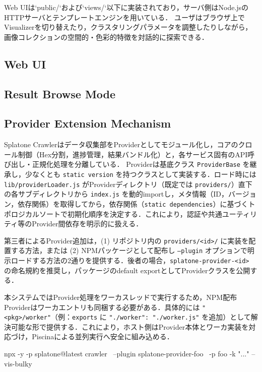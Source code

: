 \documentclass[11pt,a4paper]{jlreq}
\begin{document}
Web UIは`public/`および`views/`以下に実装されており，サーバ側はNode.jsのHTTPサーバとテンプレートエンジンを用いている．
ユーザはブラウザ上でVisualizerを切り替えたり，クラスタリングパラメータを調整したりしながら，画像コレクションの空間的・色彩的特徴を対話的に探索できる．

\subsection{Web UI}
\label{sec:webui}

\subsection{Result Browse Mode}
\label{sec:resultbrowse}

\subsection{Provider Extension Mechanism}
\label{sec:providerextension}
Splatone Crawlerはデータ収集部をProviderとしてモジュール化し，コアのクロール制御（Hex分割，進捗管理，結果バンドル化）と，各サービス固有のAPI呼び出し・正規化処理を分離している．
Providerは基底クラス \texttt{ProviderBase} を継承し，少なくとも \texttt{static version} を持つクラスとして実装する．ロード時には \texttt{lib/providerLoader.js} がProviderディレクトリ（既定では \texttt{providers/}）直下の各サブディレクトリから \texttt{index.js} を動的importし，メタ情報（ID，バージョン，依存関係）を取得してから，依存関係（\texttt{static dependencies}）に基づくトポロジカルソートで初期化順序を決定する．これにより，認証や共通ユーティリティ等のProvider間依存を明示的に扱える．

第三者によるProvider追加は，(1) リポジトリ内の \texttt{providers/<id>/} に実装を配置する方法，または (2) NPMパッケージとして配布し \texttt{--plugin} オプションで明示ロードする方法の2通りを提供する．後者の場合，\texttt{splatone-provider-<id>} の命名規約を推奨し，パッケージのdefault exportとしてProviderクラスを公開する．

本システムではProvider処理をワーカスレッドで実行するため，NPM配布Providerはワーカエントリも同梱する必要がある．具体的には \texttt{"<pkg>/worker"}（例：\texttt{exports} に \texttt{"./worker": "./worker.js"} を追加）として解決可能な形で提供する．これにより，ホスト側はProvider本体とワーカ実装を対応づけ，Piscinaによる並列実行へ安全に組み込める．

\begin{commandline}
npx -y -p splatone@latest crawler \
  --plugin splatone-provider-foo \
  -p foo -k "..." --vis-bulky
\end{commandline}
\end{document}

